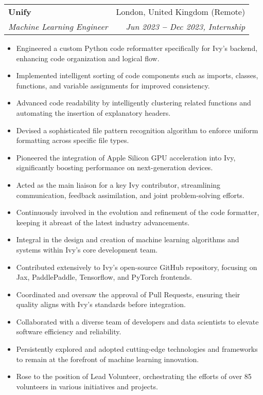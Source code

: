 \documentclass[letterpaper,11pt]{article}
\makeatletter
\newcommand{\resumeItem}[1]{
  \item\small{
    {#1 \vspace{-2pt}}
  }
}
\newcommand{\resumeSubheading}[4]{
  \vspace{-2pt}\item
    \begin{tabular*}{0.97\textwidth}[t]{l@{\extracolsep{\fill}}r}
      \textbf{#1} & #2 \\
      \textit{\small#3} & \textit{\small #4} \\
    \end{tabular*}\vspace{-7pt}
}
\newcommand{\resumeItemListStart}{\begin{itemize}}
\newcommand{\resumeItemListEnd}{\end{itemize}\vspace{-5pt}}
\makeatother
\begin{document}
          \resumeSubheading
          {Unify}{London, United Kingdom (Remote)}
          {Machine Learning Engineer}{Jun 2023 \textbf{--} Dec 2023, Internship}
            \resumeItemListStart
                \resumeItem{Engineered a custom Python code reformatter specifically for Ivy's backend, enhancing code organization and logical flow.}
                \resumeItem{Implemented intelligent sorting of code components such as imports, classes, functions, and variable assignments for improved consistency.}
                \resumeItem{Advanced code readability by intelligently clustering related functions and automating the insertion of explanatory headers.}
                \resumeItem{Devised a sophisticated file pattern recognition algorithm to enforce uniform formatting across specific file types.}
                \resumeItem{Pioneered the integration of Apple Silicon GPU acceleration into Ivy, significantly boosting performance on next-generation devices.}
                \resumeItem{Acted as the main liaison for a key Ivy contributor, streamlining communication, feedback assimilation, and joint problem-solving efforts.}
                \resumeItem{Continuously involved in the evolution and refinement of the code formatter, keeping it abreast of the latest industry advancements.}
                \resumeItem{Integral in the design and creation of machine learning algorithms and systems within Ivy's core development team.}
                \resumeItem{Contributed extensively to Ivy's open-source GitHub repository, focusing on Jax, PaddlePaddle, Tensorflow, and PyTorch frontends.}
                \resumeItem{Coordinated and oversaw the approval of Pull Requests, ensuring their quality aligns with Ivy's standards before integration.}
                \resumeItem{Collaborated with a diverse team of developers and data scientists to elevate software efficiency and reliability.}
                \resumeItem{Persistently explored and adopted cutting-edge technologies and frameworks to remain at the forefront of machine learning innovation.}
                \resumeItem{Rose to the position of Lead Volunteer, orchestrating the efforts of over 85 volunteers in various initiatives and projects.}
            \resumeItemListEnd
\end{document}
